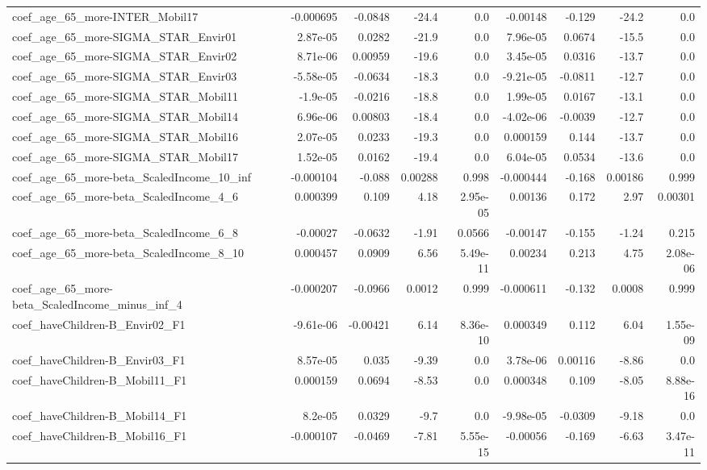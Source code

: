 \begin{tabular}{lrrrrrrrr}
coef_age_65_more-INTER_Mobil17 & -0.000695 & -0.0848 & -24.4 & 0.0 & -0.00148 & -0.129 & -24.2 & 0.0 \\
coef_age_65_more-SIGMA_STAR_Envir01 & 2.87e-05 & 0.0282 & -21.9 & 0.0 & 7.96e-05 & 0.0674 & -15.5 & 0.0 \\
coef_age_65_more-SIGMA_STAR_Envir02 & 8.71e-06 & 0.00959 & -19.6 & 0.0 & 3.45e-05 & 0.0316 & -13.7 & 0.0 \\
coef_age_65_more-SIGMA_STAR_Envir03 & -5.58e-05 & -0.0634 & -18.3 & 0.0 & -9.21e-05 & -0.0811 & -12.7 & 0.0 \\
coef_age_65_more-SIGMA_STAR_Mobil11 & -1.9e-05 & -0.0216 & -18.8 & 0.0 & 1.99e-05 & 0.0167 & -13.1 & 0.0 \\
coef_age_65_more-SIGMA_STAR_Mobil14 & 6.96e-06 & 0.00803 & -18.4 & 0.0 & -4.02e-06 & -0.0039 & -12.7 & 0.0 \\
coef_age_65_more-SIGMA_STAR_Mobil16 & 2.07e-05 & 0.0233 & -19.3 & 0.0 & 0.000159 & 0.144 & -13.7 & 0.0 \\
coef_age_65_more-SIGMA_STAR_Mobil17 & 1.52e-05 & 0.0162 & -19.4 & 0.0 & 6.04e-05 & 0.0534 & -13.6 & 0.0 \\
coef_age_65_more-beta_ScaledIncome_10_inf & -0.000104 & -0.088 & 0.00288 & 0.998 & -0.000444 & -0.168 & 0.00186 & 0.999 \\
coef_age_65_more-beta_ScaledIncome_4_6 & 0.000399 & 0.109 & 4.18 & 2.95e-05 & 0.00136 & 0.172 & 2.97 & 0.00301 \\
coef_age_65_more-beta_ScaledIncome_6_8 & -0.00027 & -0.0632 & -1.91 & 0.0566 & -0.00147 & -0.155 & -1.24 & 0.215 \\
coef_age_65_more-beta_ScaledIncome_8_10 & 0.000457 & 0.0909 & 6.56 & 5.49e-11 & 0.00234 & 0.213 & 4.75 & 2.08e-06 \\
coef_age_65_more-beta_ScaledIncome_minus_inf_4 & -0.000207 & -0.0966 & 0.0012 & 0.999 & -0.000611 & -0.132 & 0.0008 & 0.999 \\
coef_haveChildren-B_Envir02_F1 & -9.61e-06 & -0.00421 & 6.14 & 8.36e-10 & 0.000349 & 0.112 & 6.04 & 1.55e-09 \\
coef_haveChildren-B_Envir03_F1 & 8.57e-05 & 0.035 & -9.39 & 0.0 & 3.78e-06 & 0.00116 & -8.86 & 0.0 \\
coef_haveChildren-B_Mobil11_F1 & 0.000159 & 0.0694 & -8.53 & 0.0 & 0.000348 & 0.109 & -8.05 & 8.88e-16 \\
coef_haveChildren-B_Mobil14_F1 & 8.2e-05 & 0.0329 & -9.7 & 0.0 & -9.98e-05 & -0.0309 & -9.18 & 0.0 \\
coef_haveChildren-B_Mobil16_F1 & -0.000107 & -0.0469 & -7.81 & 5.55e-15 & -0.00056 & -0.169 & -6.63 & 3.47e-11 \\

\end{tabular}
